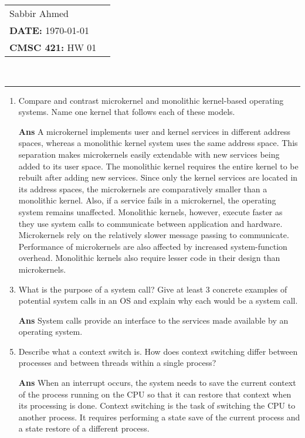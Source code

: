 \documentclass[paper=usletter, fontsize=12pt]{extarticle}
\newcommand{\documentinfo}[5]{
    \begin{centering}
        \parbox{2in}{
        \begin{spacing}{1}
            \begin{flushleft}
                \begin{tabular}{l l}
                    #1 \\
                    #2 \\
                    #3 \\
                \end{tabular}\\
                \rule{\textwidth}{1pt}
            \end{flushleft}
        \end{spacing}
        }
    \end{centering}
}
\begin{document}
    \documentinfo{Sabbir Ahmed}{\textbf{DATE:} \today}{\textbf{CMSC 421:} HW 01}
    \vspace{-0.2in}

    \begin{enumerate}[label=\textbf{\arabic*}]

        \item Compare and contrast microkernel and monolithic kernel-based
        operating systems. Name one kernel that follows each of these models.
        \item[\textbf{Ans}]
        A microkernel implements user and kernel services in different address
        spaces, whereas a monolithic kernel system uses the same address space.
        This separation makes microkernels easily extendable with new services
        being added to its user space. The monolithic kernel requires the
        entire kernel to be rebuilt after adding new services. Since only the
        kernel services are located in its address spaces, the microkernels are
        comparatively smaller than a monolithic kernel. Also, if a service
        fails in a microkernel, the operating system remains unaffected.
        Monolithic kernels, however, execute faster as they use system calls to
        communicate between application and hardware. Microkernels rely on the
        relatively slower message passing to communicate. Performance of
        microkernels are also affected by increased system-function overhead.
        Monolithic kernels also require lesser code in their design than
        microkernels.
        \vspace{0.2in}

        \item What is the purpose of a system call? Give at least 3 concrete
        examples of potential system calls in an OS and explain why each would
        be a system call.
        \item[\textbf{Ans}]
        System calls provide an interface to the services made available by an
        operating system.
        \vspace{0.2in}

        \item Describe what a context switch is. How does context switching
        differ between processes and between threads within a single process?
        \item[\textbf{Ans}]
        When an interrupt occurs, the system needs to save the current context
        of the process running on the CPU so that it can restore that context
        when its processing is done. Context switching is the task of switching
        the CPU to another process. It requires performing a state save of the
        current process and a state restore of a different process.
        \vspace{0.2in}


\end{enumerate}
\end{document}
